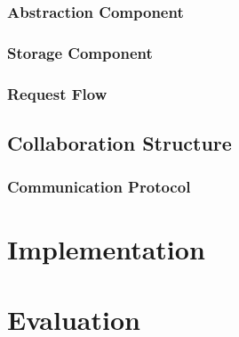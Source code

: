 \documentclass[11pt]{report}
\begin{document}
\subsection{Abstraction Component}

\subsection{Storage Component}

\subsection{Request Flow}

\section{Collaboration Structure}

\subsection{Communication Protocol}


\chapter{Implementation}


\chapter{Evaluation}

\end{document}
